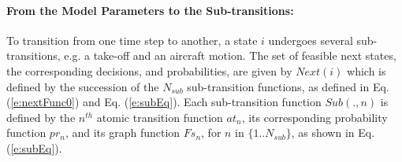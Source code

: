 \documentclass[letterpaper]{article}
\begin{document}
\paragraph{From the Model Parameters to the Sub-transitions:}

To transition from one
time step to another, a state $i$ undergoes several sub-transitions, e.g. a take-off and an aircraft motion.
The set of feasible next states, the corresponding decisions, and probabilities, are given by $Next(i)$ which is
defined by the succession of the $N_{sub}$ sub-transition functions, as defined in Eq.(\ref{e:nextFunc0}) and Eq. (\ref{e:subEq}).
Each sub-transition function $Sub(.,n)$ is defined by the $n^{th}$ atomic transition function $at_n$, 
its corresponding probability function $pr_n$, and its graph function $Fs_n$, for $n$ in $\{1..N_{sub}\}$, as shown in Eq. (\ref{e:subEq}).
\end{document}
